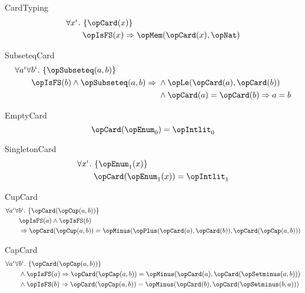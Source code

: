 \documentclass[11pt, a4paper, oneside]{article}
\begin{document}
\begin{axioms}
\item[CardTyping] \[
        \begin{aligned}
            &\forall x^\idv.\, \st{ \opCard(x) } \\
            &\qquad \opIsFS(x) \imp \opMem(\opCard(x), \opNat)
        \end{aligned}
    \]

\item[SubseteqCard] \[
        \begin{aligned}
            &\forall a^\idv \forall b^\idv.\, \st{ \opSubseteq(a, b) } \\
            &\qquad \opIsFS(b) \wedge \opSubseteq(a, b) \imp \begin{aligned}[t]
                &\wedge \opLe(\opCard(a), \opCard(b)) \\
                &\wedge \opCard(a) = \opCard(b) \imp a = b
            \end{aligned}
        \end{aligned}
    \]

\item[EmptyCard] \[
        \opCard(\opEnum_0) = \opIntlit_0
    \]

\item[SingletonCard] \[
        \begin{aligned}
            &\forall x^\idv.\, \st{ \opEnum_1(x) } \\
            &\qquad \opCard(\opEnum_1(x)) = \opIntlit_1
        \end{aligned}
    \]

\item[CupCard] \[
        \begin{aligned}
            &\forall a^\idv \forall b^\idv.\, \st{ \opCard(\opCup(a, b)) } \\
            &\qquad \opIsFS(a) \wedge \opIsFS(b) \\
            &\qquad \imp \opCard(\opCup(a, b)) = \opMinus(\opPlus(\opCard(a), \opCard(b)), \opCard(\opCap(a, b)))
        \end{aligned}
    \]

\item[CapCard] \[
        \begin{aligned}
            &\forall a^\idv \forall b^\idv.\, \st{ \opCard(\opCap(a, b)) } \\
            &\qquad \begin{aligned}[t]
                &\wedge \opIsFS(a) \imp \opCard(\opCap(a, b)) = \opMinus(\opCard(a), \opCard(\opSetminus(a, b))) \\
                &\wedge \opIsFS(b) \imp \opCard(\opCap(a, b)) = \opMinus(\opCard(b), \opCard(\opSetminus(b, a)))
            \end{aligned}
        \end{aligned}
    \]


\end{axioms}
\end{document}
